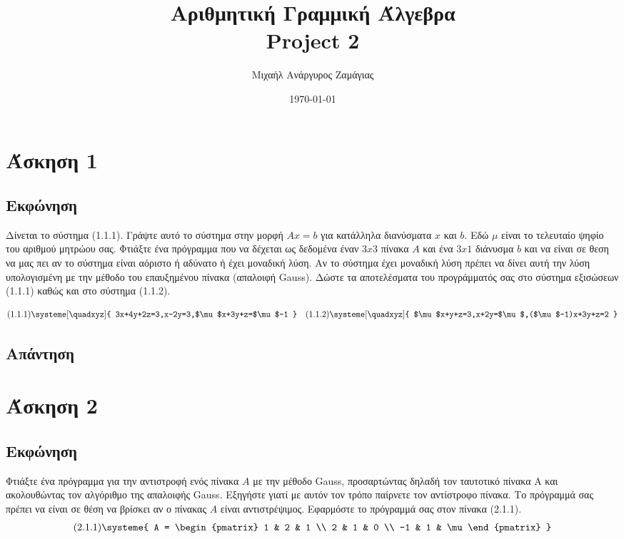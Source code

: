 \documentclass[a4paper,14pt]{extreport}
\begin{document}
\title{Αριθμητική Γραμμική Άλγεβρα\\Project 2}
\author{Μιχαήλ Ανάργυρος Ζαμάγιας}
\date{\today}
\maketitle
\newpage

\tableofcontents

\chapter{Άσκηση 1}
\section{Εκφώνηση}

Δίνεται το σύστημα (1.1.1). Γράψτε αυτό το σύστημα στην μορφή $Ax=b$ για κατάλληλα διανύσματα $x$ και $b$. Εδώ $\mu$ είναι το τελευταίο ψηφίο του αριθμού μητρώου σας. Φτιάξτε ένα πρόγραμμα που να δέχεται ως δεδομένα έναν $3x3$ πίνακα $A$ και ένα $3x1$ διάνυσμα $b$ και να είναι σε θεση να μας πει αν το σύστημα είναι αόριστο ή αδύνατο ή έχει μοναδική λύση. Αν το σύστημα έχει μοναδική λύση πρέπει να δίνει αυτή την λύση υπολογισμένη με την μέθοδο του επαυξημένου πίνακα (απαλοιφή Gauss). Δώστε τα αποτελέσματα του προγράμματός σας στο σύστημα εξισώσεων (1.1.1) καθώς και στο σύστημα (1.1.2).

\begin{align*}
    \text{(1.1.1)}\systeme[\quadxyz]{
        3x+4y+2z=3,x-2y=3,$\mu$x+3y+z=$\mu$-1
    }
     &  &
    \text{(1.1.2)}\systeme[\quadxyz]{
        $\mu$x+y+z=3,x+2y=$\mu$,($\mu$-1)x+3y+z=2
    }
\end{align*}

\newpage
\section{Απάντηση}

\chapter{Άσκηση 2}
\section{Εκφώνηση}

Φτιάξτε ένα πρόγραμμα για την αντιστροφή ενός πίνακα $A$ με την μέθοδο Gauss, προσαρτώντας δηλαδή τον ταυτοτικό πίνακα Α και ακολουθώντας τον αλγόριθμο της απαλοιφής Gauss. Εξηγήστε γιατί με αυτόν τον τρόπο παίρνετε τον αντίστροφο πίνακα. Το πρόγραμμά σας πρέπει να είναι σε θέση να βρίσκει αν ο πίνακας $A$ είναι αντιστρέψιμος. Εφαρμόστε το πρόγραμμά σας στον πίνακα (2.1.1).
\begin{align*}
    \text{(2.1.1)}\systeme{
        A = \begin{pmatrix}
            1  & 2 & 1   \\
            2  & 1 & 0   \\
            -1 & 1 & \mu
        \end{pmatrix}
    }
\end{align*}
\end{document}
